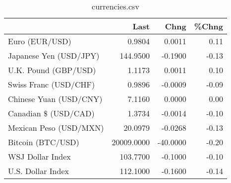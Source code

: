 \documentclass{article}%
\begin{document}
%


\begin{table}[htbp]%
\caption{currencies.csv}%
\centering%
\begin{adjustbox}{width=1\textwidth}%
\begin{tabular}{lrrr}
\toprule
                       &       Last &     Chng &  \%Chng \\
\midrule
        Euro (EUR/USD) &     0.9804 &   0.0011 &   0.11 \\
Japanese Yen (USD/JPY) &   144.9500 &  -0.1900 &  -0.13 \\
  U.K. Pound (GBP/USD) &     1.1173 &   0.0011 &   0.10 \\
 Swiss Franc (USD/CHF) &     0.9896 &  -0.0009 &  -0.09 \\
Chinese Yuan (USD/CNY) &     7.1160 &   0.0000 &   0.00 \\
  Canadian \$ (USD/CAD) &     1.3734 &  -0.0014 &  -0.10 \\
Mexican Peso (USD/MXN) &    20.0979 &  -0.0268 &  -0.13 \\
     Bitcoin (BTC/USD) & 20009.0000 & -40.0000 &  -0.20 \\
      WSJ Dollar Index &   103.7700 &  -0.1000 &  -0.10 \\
     U.S. Dollar Index &   112.1000 &  -0.1600 &  -0.14 \\
\bottomrule
\end{tabular}
%
\end{adjustbox}%
\end{table}

%
\end{document}
